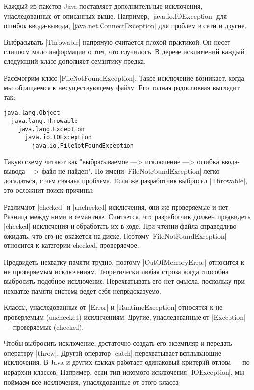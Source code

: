 Каждый из пакетов Java поставляет дополнительные исключения, унаследованные от
описанных выше. Например, \spverb|java.io.IOException| для ошибок ввода-вывода,
\spverb|java.net.ConnectException| для проблем в сети и другие.

Выбрасывать \spverb|Throwable| напрямую считается плохой практикой. Он несет слишком
мало информации о том, что случилось. В дереве исключений каждый следующий класс
дополняет семантику предка.

Рассмотрим класс \spverb|FileNotFoundException|. Такое исключение возникает, когда мы
обращаемся к несуществующему файлу. Его полная родословная выглядит так:

\begin{verbatim}
java.lang.Object
  java.lang.Throwable
    java.lang.Exception
      java.io.IOException
        java.io.FileNotFoundException
\end{verbatim}

Такую схему читают как "выбрасываемое —> исключение —> ошибка ввода-вывода —>
файл не найден". По имени \spverb|FileNotFoundException| легко догадаться, с чем
связана проблема. Если же разработчик выбросил \spverb|Throwable|, это осложнит поиск
причины.

Различают \spverb|checked| и \spverb|unchecked| исключения, они же проверяемые и нет. Разница
между ними в семантике. Считается, что разработчик должен предвидеть \spverb|checked|
исключения и обработать их в коде. При чтении файла справедливо ожидать, что его
не окажется на диске. Поэтому \spverb|FileNotFoundException| относится к категории
checked, проверяемое.

Предвидеть нехватку памяти трудно, поэтому \spverb|OutOfMemoryError| относится к не
проверяемым исключениям. Теоретически любая строка когда способна выбросить
подобное исключение. Перехватывать его нет смысла, поскольку при нехватке памяти
система ведет себя непредсказуемо.

Классы, унаследованные от \spverb|Error| и \spverb|RuntimeException| относятся к не проверяемым
(unchecked) исключениям. Другие, унаследованные от \spverb|Exception| — проверяемые
(checked).

Чтобы выбросить исключение, достаточно создать его экземпляр и передать
оператору \spverb|throw|. Другой оператор \spverb|catch| перехватывает всплывающие
исключения. В Java и других языках работает одинаковый критерий отлова — по
иерархии классов. Например, если тип искомого исключения \spverb|IOException|, мы
поймаем все исключения, унаследованные от этого класса.

